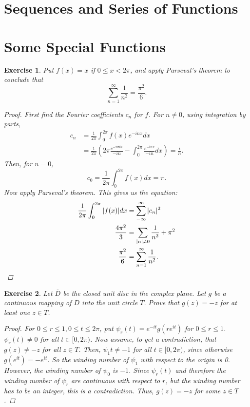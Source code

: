 \documentclass[10pt,letterpaper]{amsart}
\newtheorem{exercise}{Exercise}[section]
\theoremstyle{definition}
\theoremstyle{remark}
\numberwithin{equation}{exercise}
\begin{document}
\begin{multicols}{2}
  \section{Sequences and Series of Functions}
  \section{Some Special Functions}
  \setcounter{exercise}{12}\label{8.13}
  \begin{exercise}\label{9.13}
    Put $f(x) = x$ if $0 \le x < 2\pi$, and apply Parseval's theorem to conclude that
    \begin{equation*}
      \sum_{n=1}^\infty \frac{1}{n^2} = \frac{\pi^2}{6}.
    \end{equation*}
    \begin{proof}
      First find the Fourier coefficients $c_n$ for $f$. For $n \ne 0$, using integration by parts,
      \begin{align*}
        c_n &= \frac{1}{2\pi} \int_0^{2\pi} f(x) e^{-inx} dx\\
        &= \frac{1}{2\pi} \left( 2\pi \frac{e^{-2\pi in}}{-in} - \int_0^{2\pi} \frac{e^{-inx}}{-in} dx \right) = \frac{i}{n}.
      \end{align*}
      Then, for $n = 0$,
      \begin{equation*}
        c_0 = \frac{1}{2\pi} \int_0^{2\pi} f(x) dx = \pi.
      \end{equation*}
      Now apply Parseval's theorem. This gives us the equation:
      \begin{align*}
        \frac{1}{2\pi} \int_0^{2\pi} |f(x)| dx &= \sum_{-\infty}^\infty |c_n|^2\\
        \frac{4\pi^2}{3} &= \sum_{|n| \ne 0} \frac{1}{n^2} + \pi^2\\
        \frac{\pi^2}{6} &= \sum_{n = 1}^\infty \frac{1}{n^2}.\qedhere
      \end{align*} 
    \end{proof}
  \end{exercise}
  \setcounter{exercise}{27}
  \begin{exercise}\label{8.28}
    Let $\overline{D}$ be the closed unit disc in the complex plane. Let $g$ be a continuous mapping of $\overline{D}$ into the unit circle $T$. Prove that $g(z) = -z$ for at least one $z \in T$.
    \begin{proof}
      For $0 \le r \le 1,0 \le t \le 2\pi$, put $\psi_r(t) = e^{-it}g(re^{it})$ for $0 \le r \le 1$. $\psi_r(t) \ne 0$ for all $t \in [0,2\pi)$. Now assume, to get a contradiction, that $g(z) \ne -z$ for all $z \in T$. Then, $\psi_1{t} \ne -1$ for all $t \in [0,2\pi)$, since otherwise $g(e^{it}) = -e^{it}$. So the winding number of $\psi_1$ with respect to the origin is 0. However, the winding number of $\psi_0$ is $-1$. Since $\psi_r(t)$ and therefore the winding number of $\psi_r$ are continuous with respect to $r$, but the winding number has to be an integer, this is a contradiction. Thus, $g(z) = -z$ for some $z \in T$.

\end{proof}
\end{exercise}
\end{multicols}
\end{document}
